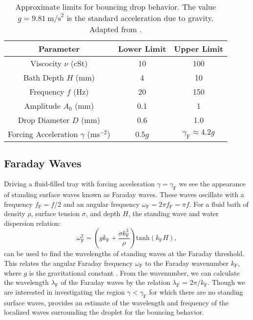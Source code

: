 	       \begin{table}[htdp] 
\caption[Basic Table 1]{Approximate limits for bouncing drop behavior. The value $g = 9.81~\mathrm{m/s}^{2}$ is the standard acceleration due to gravity. Adapted from \cite{pilot-wave}.} 
\begin{center} 
\begin{tabular}{c c c} 
\toprule 
  Parameter &  Lower Limit & Upper Limit \\
  \midrule
Viscocity $\nu$ (cSt) & 10 & 100 \\ 
Bath Depth $H$ (mm) & 4 & 10 \\
Frequency $f$ (Hz) & 20 & 150 \\
Amplitude $A_0$ (mm) & 0.1 & 1 \\
Drop Diameter $D$ (mm) & 0.6 & 1.0 \\
Forcing Acceleration $\gamma$ ($\mathrm{ms}^{-2}$) & 0.5$g$ & $\gamma_\mathrm{F} \approx 4.2g$ \\
\bottomrule 
\end{tabular}
\end{center}
\label{approxlimits} 
\end{table}	

\subsection{Faraday Waves}
Driving a fluid-filled tray with forcing acceleration $\gamma = \gamma_\mathrm{F}$ we see the appearance of standing surface waves known as Faraday waves. These waves oscillate with a  frequency $f_\mathrm{F} = f/2$ and an angular frequency $\omega_\mathrm{F} = 2\pi f_\mathrm{F}=\pi f$. For a fluid bath of density $\rho$, surface tension $\sigma$, and depth $H$, the standing wave and water dispersion relation:
\begin{equation} \label{dispersion}
\omega_\mathrm{F}^2 = \left(gk_\mathrm{F}+\frac{\sigma k_\mathrm{F}^3}{\rho}\right)\mathrm{tanh}(k_\mathrm{F}H),
\end{equation} 
can be used to find the wavelengths of standing waves at the Faraday threshold. This relates the angular Faraday frequency $\omega_\mathrm{F}$ to the Faraday wavenumber $k_\mathrm{F}$, where $g$ is the gravitational constant . From the wavenumber, we can calculate the wavelength $\lambda_\mathrm{F}$ of the Faraday waves by the relation $\lambda_\mathrm{F}$ = $2\pi/k_\mathrm{F}$. Though we are interested in investigating the region $\gamma < \gamma_\mathrm{F}$ for which there are no standing surface waves,  provides an estimate of the wavelength and frequency of the localized waves surrounding the droplet for the bouncing behavior. 


